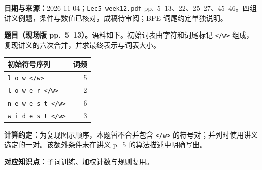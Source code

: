 
\begingroup
\linespread{1.15}\selectfont
\setlength{\parskip}{0.4em}
\renewcommand{\recordid}[1]{}
\renewcommand{\relatedtopic}[2]{\hyperref[topic:#1]{#2}}

\textbf{日期与来源：}2026-11-04；\texttt{Lec5\_week12.pdf} pp.~5--13、22、25--27、45--46。四组讲义例题，条件与数值已核对，成稿待审阅；BPE 词尾约定单独说明。

\nopagebreak[4]
\textbf{题目（现场版 pp.~5--13）。}语料如下。初始词表由字符和词尾标记 \texttt{</w>} 组成，复现讲义的六次合并，并求最终表示与词表大小。
\begin{center}
\begin{tabular}{@{}lr@{}}
\toprule
初始符号序列 & 词频 \\
\midrule
\texttt{l o w </w>} & 5 \\
\texttt{l o w e r </w>} & 2 \\
\texttt{n e w e s t </w>} & 6 \\
\texttt{w i d e s t </w>} & 3 \\
\bottomrule
\end{tabular}
\end{center}
\textbf{计算约定：}为复现图示顺序，本题暂不合并包含 \texttt{</w>} 的符号对；并列时使用讲义选定的一对。该额外条件未在讲义 p.~5 的算法描述中明确写出。

\textbf{对应知识点：}\relatedtopic{SC4002-L12-T01}{子词训练、加权计数与规则复用}。

